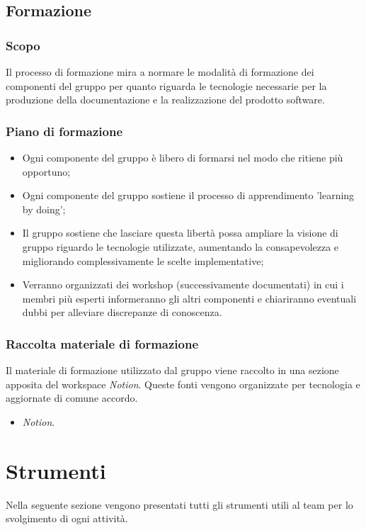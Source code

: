 \documentclass[10pt, a4paper]{article}
\begin{document}
\subsection{Formazione}
\subsubsection{Scopo}
Il processo di formazione mira a normare le modalità di formazione dei componenti del gruppo per quanto riguarda le tecnologie necessarie per la produzione della documentazione e la realizzazione del prodotto software.

\subsubsection{Piano di formazione}
\begin{itemize}
    \item Ogni componente del gruppo è libero di formarsi nel modo che ritiene più opportuno;
    \item Ogni componente del gruppo sostiene il processo di apprendimento 'learning by doing';
    \item Il gruppo sostiene che lasciare questa libertà possa ampliare la visione di gruppo riguardo le tecnologie utilizzate, aumentando la consapevolezza e migliorando complessivamente le scelte implementative;
    \item Verranno organizzati dei workshop (successivamente documentati) in cui i membri più esperti informeranno gli altri componenti e chiariranno eventuali dubbi per alleviare discrepanze di conoscenza.

\end{itemize}



\subsubsection{Raccolta materiale di formazione}
Il materiale di formazione utilizzato dal gruppo viene raccolto in una sezione apposita del workspace \textit{Notion}.
Queste fonti vengono organizzate per tecnologia e aggiornate di comune accordo.


\begin{itemize}
    \item \textit{Notion}.
\end{itemize}

\newpage

\newpage
\section{Strumenti}
Nella seguente sezione vengono presentati tutti gli strumenti utili al team per lo svolgimento di ogni attività.
\end{document}

